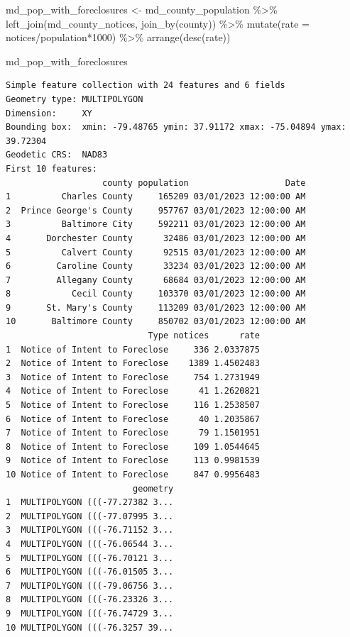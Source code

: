 \documentclass[
  letterpaper,
  DIV=11,
  numbers=noendperiod]{scrreprt}
\newenvironment{Shaded}{\begin{snugshade}}{\end{snugshade}}
\newcommand{\AttributeTok}[1]{\textcolor[rgb]{0.40,0.45,0.13}{#1}}
\newcommand{\DecValTok}[1]{\textcolor[rgb]{0.68,0.00,0.00}{#1}}
\newcommand{\FunctionTok}[1]{\textcolor[rgb]{0.28,0.35,0.67}{#1}}
\newcommand{\NormalTok}[1]{\textcolor[rgb]{0.00,0.23,0.31}{#1}}
\newcommand{\OtherTok}[1]{\textcolor[rgb]{0.00,0.23,0.31}{#1}}
\newcommand{\SpecialCharTok}[1]{\textcolor[rgb]{0.37,0.37,0.37}{#1}}
\begin{document}
\begin{Shaded}
\begin{Highlighting}[]
\NormalTok{md\_pop\_with\_foreclosures }\OtherTok{\textless{}{-}}\NormalTok{ md\_county\_population }\SpecialCharTok{\%\textgreater{}\%}
  \FunctionTok{left\_join}\NormalTok{(md\_county\_notices, }\FunctionTok{join\_by}\NormalTok{(county)) }\SpecialCharTok{\%\textgreater{}\%} 
  \FunctionTok{mutate}\NormalTok{(}\AttributeTok{rate =}\NormalTok{ notices}\SpecialCharTok{/}\NormalTok{population}\SpecialCharTok{*}\DecValTok{1000}\NormalTok{) }\SpecialCharTok{\%\textgreater{}\%}
  \FunctionTok{arrange}\NormalTok{(}\FunctionTok{desc}\NormalTok{(rate))}

\NormalTok{md\_pop\_with\_foreclosures}
\end{Highlighting}
\end{Shaded}

\begin{verbatim}
Simple feature collection with 24 features and 6 fields
Geometry type: MULTIPOLYGON
Dimension:     XY
Bounding box:  xmin: -79.48765 ymin: 37.91172 xmax: -75.04894 ymax: 39.72304
Geodetic CRS:  NAD83
First 10 features:
                   county population                   Date
1          Charles County     165209 03/01/2023 12:00:00 AM
2  Prince George's County     957767 03/01/2023 12:00:00 AM
3          Baltimore City     592211 03/01/2023 12:00:00 AM
4       Dorchester County      32486 03/01/2023 12:00:00 AM
5          Calvert County      92515 03/01/2023 12:00:00 AM
6         Caroline County      33234 03/01/2023 12:00:00 AM
7         Allegany County      68684 03/01/2023 12:00:00 AM
8            Cecil County     103370 03/01/2023 12:00:00 AM
9       St. Mary's County     113209 03/01/2023 12:00:00 AM
10       Baltimore County     850702 03/01/2023 12:00:00 AM
                            Type notices      rate
1  Notice of Intent to Foreclose     336 2.0337875
2  Notice of Intent to Foreclose    1389 1.4502483
3  Notice of Intent to Foreclose     754 1.2731949
4  Notice of Intent to Foreclose      41 1.2620821
5  Notice of Intent to Foreclose     116 1.2538507
6  Notice of Intent to Foreclose      40 1.2035867
7  Notice of Intent to Foreclose      79 1.1501951
8  Notice of Intent to Foreclose     109 1.0544645
9  Notice of Intent to Foreclose     113 0.9981539
10 Notice of Intent to Foreclose     847 0.9956483
                         geometry
1  MULTIPOLYGON (((-77.27382 3...
2  MULTIPOLYGON (((-77.07995 3...
3  MULTIPOLYGON (((-76.71152 3...
4  MULTIPOLYGON (((-76.06544 3...
5  MULTIPOLYGON (((-76.70121 3...
6  MULTIPOLYGON (((-76.01505 3...
7  MULTIPOLYGON (((-79.06756 3...
8  MULTIPOLYGON (((-76.23326 3...
9  MULTIPOLYGON (((-76.74729 3...
10 MULTIPOLYGON (((-76.3257 39...
\end{verbatim}
\end{document}
